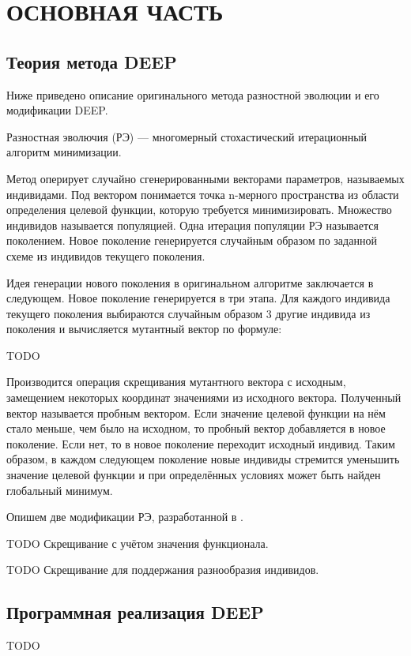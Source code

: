 \setcounter{figure}{0} \setcounter{table}{0} \setcounter{equation}{0}
\chapter*{ОСНОВНАЯ ЧАСТЬ}
\section*{Теория метода DEEP}

Ниже приведено описание оригинального метода разностной эволюции и его модификации DEEP.

Разностная эволючия (РЭ) --- многомерный стохастический итерационный алгоритм минимизации.

Метод оперирует случайно сгенерированными векторами параметров, называемых индивидами. 
Под вектором понимается точка n-мерного пространства из области определения целевой функции, которую требуется минимизировать.
Множество индивидов называется популяцией.
Одна итерация популяции РЭ называется поколением.
Новое поколение генерируется случайным образом по заданной схеме из индивидов текущего поколения.

Идея генерации нового поколения в оригинальном алгоритме заключается в следующем.
Новое поколение генерируется в три этапа.
Для каждого индивида текущего поколения выбираются случайным образом 3 другие индивида из поколения и вычисляется мутантный вектор по формуле:

TODO

Производится операция скрещивания мутантного вектора с исходным, замещением некоторых координат значениями из исходного вектора.
Полученный вектор называется пробным вектором.
Если значение целевой функции на нём стало меньше, чем было на исходном, то пробный вектор добавляется в новое поколение.
Если нет, то в новое поколение переходит исходный индивид.
Таким образом, в каждом следующем поколение новые индивиды стремится уменьшить значение целевой функции и при определённых условиях может быть найден глобальный минимум.

Опишем две модификации РЭ, разработанной в \cite{KozlovThesis}.

TODO Скрещивание с учётом значения функционала.

TODO Скрещивание для поддержания разнообразия индивидов.

\section*{Программная реализация DEEP}
TODO

